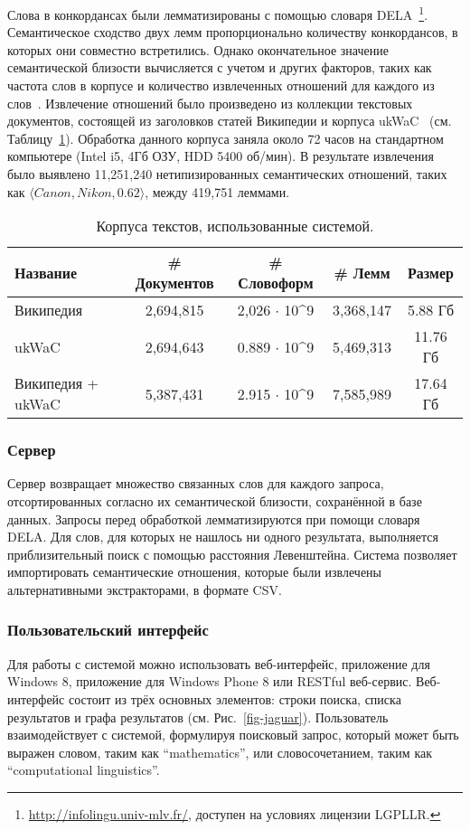 \documentclass[a4paper,10pt,twoside]{article}
\begin{document}
Слова в конкордансах были лемматизированы с помощью словаря DELA~\footnote{\url{http://infolingu.univ-mlv.fr/}, доступен на условиях лицензии LGPLLR.}. Семантическое сходство двух лемм пропорционально количеству конкордансов, в которых они совместно встретились. Однако окончательное значение семантической близости вычисляется с учетом и других факторов, таких как частота слов в корпусе и количество извлеченных отношений для каждого из слов~\cite{panchenko2012konvens}. Извлечение отношений было произведено из коллекции текстовых документов, состоящей из заголовков статей Википедии и корпуса ukWaC~\cite{baroni2009wacky} (см. Таблицу~\ref{tbl:corpora}). Обработка данного корпуса заняла около 72 часов на стандартном компьютере (Intel i5, 4Гб ОЗУ, HDD 5400 об/мин). В результате извлечения было выявлено 11,251,240 нетипизированных семантических отношений, таких как  $\langle Canon, Nikon, 0.62 \rangle$, между 419,751 леммами. 


\begin{table}
\centering
\footnotesize
\begin{tabular}{|l|c|c|c|c|}
  \hline              
  Название & \# Документов & \# Словоформ & \# Лемм &  Размер \\ \hline         \hline           
  Википедия & 2,694,815 & 2,026 $\cdot$ 10^9 & 3,368,147 & 5.88 Гб \\
  ukWaC & 2,694,643 & 0.889 $\cdot$ 10^9 & 5,469,313 & 11.76 Гб \\ 
  Википедия + ukWaC & 5,387,431 & 2.915 $\cdot$ 10^9 & 7,585,989 & 17.64 Гб\\
  \hline  
\end{tabular}
\caption{Корпуса текстов, использованные системой.}
\label{tbl:corpora}
\end{table}

\subsubsection{Сервер} Сервер возвращает множество связанных слов для каждого запроса, отсортированных согласно их семантической близости, сохранённой в базе данных. Запросы перед обработкой лемматизируются при помощи словаря DELA. Для слов, для которых не нашлось ни одного результата, выполняется приблизительный поиск с помощью расстояния Левенштейна. Система позволяет импортировать семантические отношения, которые были извлечены альтернативными экстракторами, в формате CSV.

\subsubsection{Пользовательский интерфейс} Для работы с системой можно использовать веб-интерфейс, приложение для Windows 8, приложение для Windows Phone 8 или RESTful веб-сервис. Веб-интерфейс состоит из трёх основных элементов: строки поиска, списка результатов и графа результатов (см. Рис.~\ref{fig-jaguar}). Пользователь взаимодействует с системой, формулируя поисковый запрос, который может быть выражен словом, таким как ``mathematics'', или словосочетанием, таким как ``computational linguistics''. 
\end{document}

